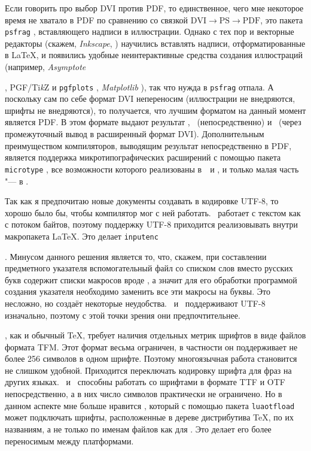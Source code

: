 \documentclass[a4paper,12pt,hyphens]{article}
\newcommand\softname[1]{\textit{#1}}
\newcommand\package[1]{\texttt{#1}}
\newcommand\lcmd[1]{\texttt{#1}}
\DeclareRobustCommand{\TikZ}{\textrm{Ti\textit{k}Z}}
\begin{document}
Если говорить про выбор DVI против PDF, то единственное, чего мне некоторое время
не хватало в PDF по сравнению со связкой $\text{DVI}\to\text{PS}\to\text{PDF}$,
это пакета \package{psfrag} \parencite{ctan-psfrag}, вставляющего надписи в иллюстрации. Однако с тех
пор и векторные редакторы (скажем, \softname{Inkscape}, \cite{site-inkscape})
научились вставлять надписи,
отформатированные в \LaTeX, и появились удобные неинтерактивные средства создания
иллюстраций (например, \softname{Asymptote}
\begin{otherlanguage}{english}\parencite{site-asymptote,ctan-asymptote}\end{otherlanguage},
PGF/\TikZ{} \parencite{ctan-pgf} и \package{pgfplots} \parencite{ctan-pgfplots},
\softname{Matplotlib} \parencite{site-matplotlib}), так что нужда в \package{psfrag}
отпала. А поскольку сам по себе формат DVI непереносим (иллюстрации не
внедряются, шрифты не внедряются), то получается, что лучшим форматом на данный
момент является PDF. В этом формате выдают результат \pdfTeX, \LuaTeX\ (непосредственно)
и \XeTeX\ (через промежуточный вывод в расширенный формат DVI).
Дополнительным преимуществом компиляторов, выводящим результат непосредственно в PDF,
является поддержка микротипографических расширений с помощью пакета
\package{microtype} \parencite{ctan-microtype}, все возможности которого реализованы
в~\pdfTeX\ и \LuaTeX, и только малая часть "--- в \XeTeX.

Так как я предпочитаю новые документы создавать в кодировке UTF-8, то хорошо было
бы, чтобы компилятор мог с ней работать. \pdfTeX\ работает с текстом как с потоком
байтов, поэтому поддержку UTF-8 приходится реализовывать внутри макропакета \LaTeX.
Это делает \package{inputenc}
\begin{otherlanguage}{english}\parencite{ctan-inputenc,se-inputenc}\end{otherlanguage}.
Минусом данного решения является то, что, скажем,
при составлении предметного указателя вспомогательный файл со списком слов
вместо русских букв содержит списки макросов вроде \lcmd{\IeC {\cyro }},
а значит для его обработки программой создания указателя необходимо заменить
все эти макросы на буквы. Это несложно, но создаёт некоторые неудобства.
\XeTeX\ и \LuaTeX\ поддерживают UTF-8 изначально, поэтому с этой точки зрения
они предпочтительнее.

\pdfTeX, как и обычный \TeX, требует наличия отдельных метрик шрифтов в виде
файлов формата TFM. Этот формат весьма ограничен, в частности он поддерживает не
более 256 символов в одном шрифте. Поэтому многоязычная работа становится не
слишком удобной. Приходится переключать кодировку шрифта для фраз на других
языках. \XeTeX\ и \LuaTeX\ способны работать со шрифтами в формате TTF и OTF
непосредственно, а в них число символов практически не ограничено. Но в
данном аспекте мне больше нравится \LuaTeX, который с помощью пакета
\package{luaotfload} \parencite{ctan-luaotfload} может подключать шрифты, расположенные в дереве
дистрибутива \TeX, по их названиям, а не только по
именам файлов как для \XeTeX. Это делает его более переносимым между
платформами.
\end{document}
